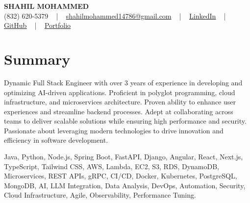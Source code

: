 \documentclass[letterpaper,10pt]{article}
\begin{document}
\begin{center}
    {\fontsize{14pt}{12pt}\selectfont \textbf{\MakeUppercase{Shahil Mohammed}}}\\ \vspace{2pt}
    \fontsize{10pt}{12pt}\selectfont (832) 620-5379 ~ | ~ \href{mailto:shahilmohammed14786@gmail.com}{shahilmohammed14786@gmail.com} ~ | ~  
    \href{https://www.linkedin.com/in/shahil-mohammed-9652931a1/}{\color{blue}\underline{LinkedIn}}  ~ | ~ 
    \href{https://github.com/freakbeast14}{\color{blue}\underline{GitHub}} ~ | ~ 
    \href{https://shahil-mohammed.netlify.app/}{\color{blue}\underline{Portfolio}}
    \vspace{-8pt}
\end{center}

\section{Summary}
\vspace{-2pt}\fontsize{8pt}{9pt}\selectfont
Dynamic Full Stack Engineer with over 3 years of experience in developing and optimizing AI-driven applications. Proficient in polyglot programming, cloud infrastructure, and microservices architecture. Proven ability to enhance user experiences and streamline backend processes. Adept at collaborating across teams to deliver scalable solutions while ensuring high performance and security. Passionate about leveraging modern technologies to drive innovation and efficiency in software development.
 \vspace{-5pt}
 
{\fontsize{1pt}{1pt}\selectfont\color{white}
Java, Python, Node.js, Spring Boot, FastAPI, Django, Angular, React, Next.js, TypeScript, Tailwind CSS, AWS, Lambda, EC2, S3, RDS, DynamoDB, Microservices, REST APIs, gRPC, CI/CD, Docker, Kubernetes, PostgreSQL, MongoDB, AI, LLM Integration, Data Analysis, DevOps, Automation, Security, Cloud Infrastructure, Agile, Observability, Performance Tuning.
}
\vspace{-8pt}

\vspace{-2pt}
\end{document}
